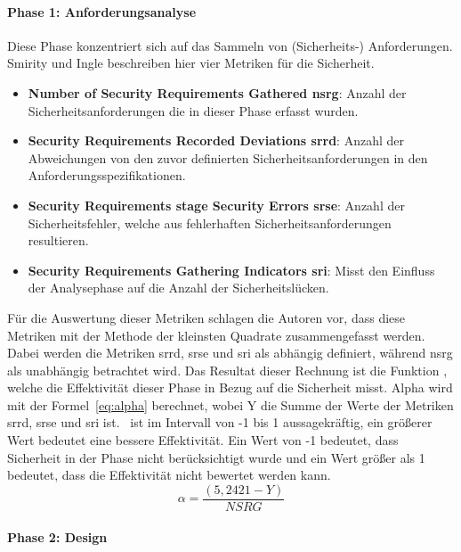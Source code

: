 \documentclass[12pt, a4paper, ngerman]{article}
\begin{document}
\paragraph{Phase 1: Anforderungsanalyse}

Diese Phase konzentriert sich auf das Sammeln von (Sicherheits-) Anforderungen.
Smirity und Ingle beschreiben hier vier Metriken für die Sicherheit.
\begin{itemize}
  \item \textbf{Number of Security Requirements Gathered \acs{nsrg}}: Anzahl der Sicherheitsanforderungen die in dieser Phase erfasst wurden.
  \item \textbf{Security Requirements Recorded Deviations \acs{srrd}}: Anzahl der Abweichungen von den zuvor definierten Sicherheitsanforderungen in den Anforderungsspezifikationen.
  \item \textbf{Security Requirements stage Security Errors \acs{srse}}: Anzahl der Sicherheitsfehler, welche aus fehlerhaften Sicherheitsanforderungen resultieren.
  \item \textbf{Security Requirements Gathering Indicators \acs{sri}}: Misst den Einfluss der Analysephase auf die Anzahl der Sicherheitslücken. 
\end{itemize}
Für die Auswertung dieser Metriken schlagen die Autoren vor, dass diese Metriken mit der Methode der kleinsten Quadrate zusammengefasst werden.
Dabei werden die Metriken \ac{srrd}, \ac{srse} und \ac{sri} als abhängig definiert, während \ac{nsrg} als unabhängig betrachtet wird.
Das Resultat dieser Rechnung ist die Funktion \alpha, welche die Effektivität dieser Phase in Bezug auf die Sicherheit misst.
Alpha wird mit der Formel~\ref{eq:alpha} berechnet, wobei Y die Summe der Werte der Metriken \ac{srrd}, \ac{srse} und \ac{sri} ist.
\alpha~ist im Intervall von -1 bis 1 aussagekräftig, ein größerer Wert bedeutet eine bessere Effektivität.
Ein Wert von -1 bedeutet, dass Sicherheit in der Phase nicht berücksichtigt wurde 
und ein Wert größer als 1 bedeutet, dass die Effektivität nicht bewertet werden kann.
\begin{equation} \label{eq:alpha}
  \alpha = \frac{ \left( 5,2421 - Y \right) }{ NSRG }
\end{equation}

\paragraph{Phase 2: Design}
\end{document}
